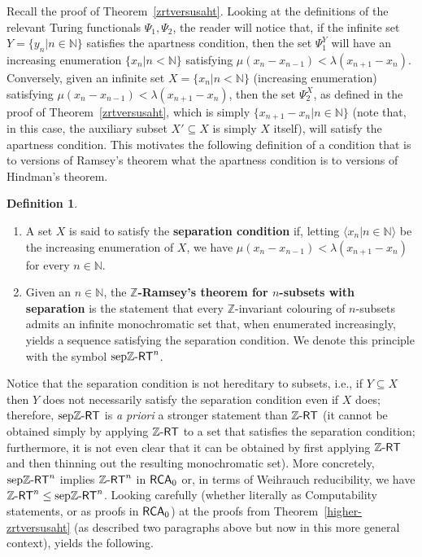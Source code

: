\documentclass[10pt,a4paper]{amsart}
\newcommand{\zrt}{\mathnormal{\mathbb Z\text{-}\mathsf{RT}}}
\newcommand{\sepzrt}{\mathnormal{\mathrm{sep}\mathbb Z\text{-}\mathsf{RT}}}
\newcommand{\rca}{\mathnormal{\mathsf{RCA}}_0}
\theoremstyle{definition}
\newtheorem{definition}[theorem]{Definition}
\begin{document}
Recall the proof of Theorem~\ref{zrtversusaht}. Looking at the definitions of the relevant Turing functionals $\Psi_1,\Psi_2$, the reader will notice that, if the infinite set $Y=\{y_n\big|n\in\mathbb N\}$ satisfies the apartness condition, then the set $\Psi_1^Y$ will have an increasing enumeration $\{x_n\big|n<\mathbb N\}$ satisfying $\mu(x_n-x_{n-1})<\lambda(x_{n+1}-x_n)$. Conversely, given an infinite set $X=\{x_n\big|n<\mathbb N\}$ (increasing enumeration) satisfying $\mu(x_n-x_{n-1})<\lambda(x_{n+1}-x_n)$, then the set $\Psi_2^X$, as defined in the proof of Theorem~\ref{zrtversusaht}, which is simply $\{x_{n+1}-x_n\big|n\in\mathbb N\}$ (note that, in this case, the auxiliary subset $X'\subseteq X$ is simply $X$ itself), will satisfy the apartness condition. This motivates the following definition of a condition that is to versions of Ramsey's theorem what the apartness condition is to versions of Hindman's theorem.

\begin{definition}\hfill
\begin{enumerate}
\item A set $X$ is said to satisfy the {\bf separation condition} if, letting $\langle x_n\big|n\in\mathbb N\rangle$ be the increasing enumeration of $X$, we have $\mu(x_n-x_{n-1})<\lambda(x_{n+1}-x_n)$ for every $n\in\mathbb N$.  
\item Given an $n\in\mathbb N$, the {\bf $\mathbb Z$-Ramsey's theorem for $n$-subsets with separation} is the statement that every $\mathbb Z$-invariant colouring of $n$-subsets admits an infinite monochromatic set that, when enumerated increasingly, yields a sequence satisfying the separation condition. We denote this principle with the symbol $\sepzrt^n$.
\end{enumerate}
\end{definition}

Notice that the separation condition is not hereditary to subsets, i.e., if $Y\subseteq X$ then $Y$ does not necessarily satisfy the separation condition even if $X$ does; therefore, $\sepzrt$ is {\it a priori} a stronger statement than $\zrt$ (it cannot be obtained simply by applying $\zrt$ to a set that satisfies the separation condition; furthermore, it is not even clear that it can be obtained by first applying $\zrt$ and then thinning out the resulting monochromatic set). More concretely, $\sepzrt^n$ implies $\zrt^n$ in $\rca$ or, in terms of Weihrauch reducibility, we have $\zrt^n\leq\sepzrt^n$. Looking carefully (whether literally as Computability statements, or as proofs in $\rca$) at the proofs from Theorem~\ref{higher-zrtversusaht} (as described two paragraphs above but now in this more general context), yields the following.
\end{document}
